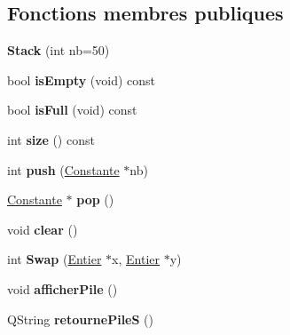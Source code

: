 \subsection*{Fonctions membres publiques}
\begin{DoxyCompactItemize}
\item 
\hypertarget{class_stack_a8cf5d6fd8d89b6edbf64da16e3206a56}{{\bfseries Stack} (int nb=50)}\label{class_stack_a8cf5d6fd8d89b6edbf64da16e3206a56}

\item 
\hypertarget{class_stack_a51464b7aa2a497ebc751862120debbda}{bool {\bfseries is\-Empty} (void) const }\label{class_stack_a51464b7aa2a497ebc751862120debbda}

\item 
\hypertarget{class_stack_a83e4a6131725241f7919ea27b8ab812b}{bool {\bfseries is\-Full} (void) const }\label{class_stack_a83e4a6131725241f7919ea27b8ab812b}

\item 
\hypertarget{class_stack_ae53b3e26c5288bb1974693b1b2767a69}{int {\bfseries size} () const }\label{class_stack_ae53b3e26c5288bb1974693b1b2767a69}

\item 
\hypertarget{class_stack_a7248e17bcd1ffd2d0e7244fdcffc8f16}{int {\bfseries push} (\hyperlink{class_calcul_1_1_constante}{Constante} $\ast$nb)}\label{class_stack_a7248e17bcd1ffd2d0e7244fdcffc8f16}

\item 
\hypertarget{class_stack_ae3da45c6867f3bbafa276df693770b25}{\hyperlink{class_calcul_1_1_constante}{Constante} $\ast$ {\bfseries pop} ()}\label{class_stack_ae3da45c6867f3bbafa276df693770b25}

\item 
\hypertarget{class_stack_adab1284b8929385d4020356fb52c8139}{void {\bfseries clear} ()}\label{class_stack_adab1284b8929385d4020356fb52c8139}

\item 
\hypertarget{class_stack_a96f913d70f6f5185d2782ac6ac5d787b}{int {\bfseries Swap} (\hyperlink{class_calcul_1_1_entier}{Entier} $\ast$x, \hyperlink{class_calcul_1_1_entier}{Entier} $\ast$y)}\label{class_stack_a96f913d70f6f5185d2782ac6ac5d787b}

\item 
\hypertarget{class_stack_aef7eba142243dda7ba09ddc2f53e72fb}{void {\bfseries afficher\-Pile} ()}\label{class_stack_aef7eba142243dda7ba09ddc2f53e72fb}

\item 
\hypertarget{class_stack_a8803f6b50bd662c27abc508a6a3f7fb3}{Q\-String {\bfseries retourne\-Pile\-S} ()}\label{class_stack_a8803f6b50bd662c27abc508a6a3f7fb3}


\end{DoxyCompactItemize}
